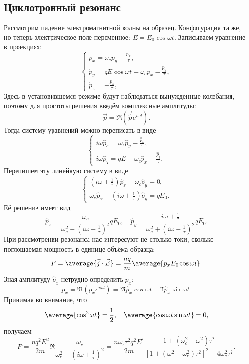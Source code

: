 \subsection{Циклотронный резонанс}
    Рассмотрим падение электромагнитной волны на образец. Конфигурация та же, но
    теперь электрическое поле переменное: \( E = E_0\cos\omega t \). Записываем
    уравнение в проекциях:
    \[
        \left\{
            \begin{array}{l}
                \dot{p}_x = \omega_c p_y - \frac{p_x}{\tau}, \\
                \dot{p}_y = qE\cos\omega t - \omega_c p_x - \frac{p_y}{\tau}, \\
                \dot{p}_z = -\frac{p_z}{\tau},
            \end{array}
        \right.
    \]
    Здесь в установившемся режиме будут наблюдаться вынужденные колебания,
    поэтому для простоты решения введём комплексные амплитуды:
    \[
        \vec{p} = \Re\left(\vec{\hat{p}}e^{i\omega t}\right).
    \]
    Тогда систему уравнений можно переписать в виде
    \[
        \left\{
            \begin{array}{l}
                i\omega\hat{p}_x = \omega_c\hat{p}_y - \frac{\hat{p}_x}{\tau},\\
                i\omega\hat{p}_y = qE - \omega_c\hat{p}_x -
                    \frac{\hat{p}_y}{\tau}.
            \end{array}
        \right.
    \]
    Перепишем эту линейную систему в виде
    \[
         \left\{
            \begin{array}{l}
                (i\omega + \frac{1}{\tau})\hat{p}_x - \omega_c\hat{p}_y = 0,\\
                \omega_c\hat{p}_x + (i\omega + \frac{1}{\tau})\hat{p}_y = qE_0.
            \end{array}
        \right.
    \]
    Её решение имеет вид
    \[
        \hat{p}_x = \frac{\omega_c}{\omega_c^2 + (i\omega + \frac{1}{\tau})^2}
            qE_0, \quad
        \hat{p}_y = \frac{i\omega + \frac{1}{\tau}}
            {\omega_c^2 + (i\omega + \frac{1}{\tau})^2} qE_0.
    \]
    При рассмотрении резонанса нас интересуют не столько токи, сколько
    поглощаемая мощность в единице объёма образца:
    \[
        P = \average{\vec{j}\cdot\vec{E}} =
        \frac{nq}{m}\average{p_xE_0\cos\omega t}.
    \]
    Зная амплитуду \( \hat{p}_x \) нетрудно определить \( p_x \):
    \[
        p_x = \Re (\hat{p}_xe^{i\omega t}) = \Re\hat{p}_x \cos\omega t -
            \Im\hat{p}_x \sin\omega t.
    \]
    Принимая во внимание, что
    \[
        \average{\cos^2\omega t} = \frac{1}{2}, \quad
        \average{\cos\omega t \sin\omega t} = 0,
    \]
    получаем
    \[
        P = \frac{nq^2E^2}{2m}
        \Re\frac{\omega_c}{\omega_c^2 + (i\omega + \frac{1}{\tau})^2} =
        \frac{n\omega_c\tau^2q^2E^2}{2m}
        \frac{1 + (\omega_c^2 - \omega^2)\tau^2}
        {\left[1 + (\omega^2 - \omega_c^2)\tau^2\right]^2 +
        4\omega_c^2\tau^2}.
    \]
